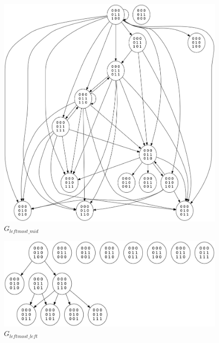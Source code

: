 \documentclass[12pt]{article}
\begin{document}
\begin{figure}
  \includegraphics[scale=0.40]{body/images/graph_leftmost_mid.jpg}
  \caption{$G_{leftmost\_mid}$}
  \label{fig:graph_leftmost_mid}
\end{figure}

\begin{figure}
  \includegraphics[scale=0.40]{body/images/graph_leftmost_left.jpg}
  \caption{$G_{leftmost\_left}$}
  \label{fig:graph_leftmost_left}
\end{figure}


\end{document}
